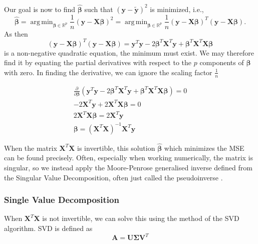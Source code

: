 \documentclass{article}
\DeclareMathOperator*{\argmin}{arg\,min}
\begin{document}
Our goal is now to find $\boldsymbol{\hat{\beta}}$ such that $\left( \boldsymbol{y} - \boldsymbol{\tilde{y}} \right)^2$ is minimized, i.e.,
\begin{equation*}
    \boldsymbol{\hat{\beta}}  = \argmin_{\boldsymbol{\beta} \in \mathbb{R}^p} \frac{1}{n} \left( \boldsymbol{y} - \boldsymbol{X\beta} \right)^2 = \argmin_{\boldsymbol{\beta} \in \mathbb{R}^p} \frac{1}{n} \left( \boldsymbol{y} - \boldsymbol{X\beta} \right)^T \left( \boldsymbol{y} - \boldsymbol{X\beta} \right).
\end{equation*}
As then
\begin{equation*}
    \left( \boldsymbol{y} - \boldsymbol{X\beta} \right)^T \left( \boldsymbol{y} - \boldsymbol{X\beta} \right) = \boldsymbol{y}^T \boldsymbol{y} - 2 \boldsymbol{\beta}^T \boldsymbol{X}^T \boldsymbol{y} + \boldsymbol{\beta}^T \boldsymbol{X}^T \boldsymbol{X} \boldsymbol{\beta} 
\end{equation*}
is a non-negative quadratic equation, the minimum must exist. We may therefore find it by equating the partial derivatives with respect to the $p$ components of $\boldsymbol{\beta}$ with zero. In finding the derivative, we can ignore the scaling factor $\frac{1}{n}$

\begin{gather*}
    \frac{\partial}{\partial \boldsymbol{\beta}} \left( \boldsymbol{y}^T \boldsymbol{y} - 2 \boldsymbol{\beta}^T \boldsymbol{X}^T \boldsymbol{y} + \boldsymbol{\beta}^T \boldsymbol{X}^T \boldsymbol{X} \boldsymbol{\beta} \right) = 0 \\
    -2 \boldsymbol{X}^T \boldsymbol{y} + 2 \boldsymbol{X}^T \boldsymbol{X \beta} = 0 \\
    2 \boldsymbol{X}^T \boldsymbol{X \beta} = 2 \boldsymbol{X}^T \boldsymbol{y} \\
    \boldsymbol{\beta} = \left( \boldsymbol{X}^T \boldsymbol{X} \right)^{-1} \boldsymbol{X}^T \boldsymbol{y}
\end{gather*}

When the matrix $\boldsymbol{X}^T \boldsymbol{X}$ is invertible, this solution $\boldsymbol{\hat{\beta}}$ which minimizes the MSE can be found precisely. Often, especially when working numerically, the matrix is singular, so we instead apply the Moore-Penrose generalised inverse defined from the Singular Value Decomposition, often just called the pseudoinverse \cite[p.~74--82]{introNumeric}.


\subsubsection{Single Value Decomposition}
When $\mathbf{X}^T\mathbf{X}$ is not invertible, we can solve this using the method of the SVD algorithm. SVD is defined as
\begin{equation*}
    \mathbf{A} = \mathbf{U}\mathbf{\Sigma}\mathbf{V}^T
\end{equation*}
\end{document}
